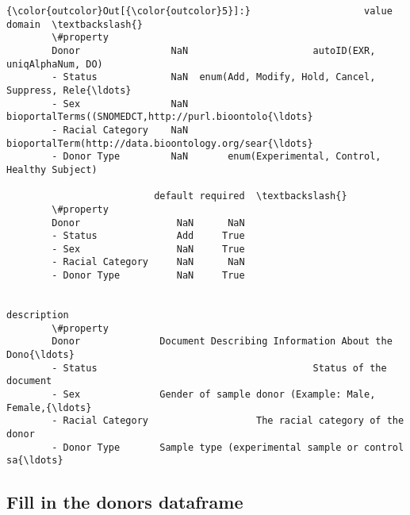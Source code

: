 \documentclass[11pt]{article}
\begin{document}
\begin{Verbatim}[commandchars=\\\{\}]
{\color{outcolor}Out[{\color{outcolor}5}]:}                    value                                             domain  \textbackslash{}
        \#property                                                                     
        Donor                NaN                      autoID(EXR, uniqAlphaNum, DO)   
        - Status             NaN  enum(Add, Modify, Hold, Cancel, Suppress, Rele{\ldots}   
        - Sex                NaN  bioportalTerms((SNOMEDCT,http://purl.bioontolo{\ldots}   
        - Racial Category    NaN  bioportalTerm(http://data.bioontology.org/sear{\ldots}   
        - Donor Type         NaN       enum(Experimental, Control, Healthy Subject)   
        
                          default required  \textbackslash{}
        \#property                            
        Donor                 NaN      NaN   
        - Status              Add     True   
        - Sex                 NaN     True   
        - Racial Category     NaN      NaN   
        - Donor Type          NaN     True   
        
                                                                 description  
        \#property                                                             
        Donor              Document Describing Information About the Dono{\ldots}  
        - Status                                      Status of the document  
        - Sex              Gender of sample donor (Example: Male, Female,{\ldots}  
        - Racial Category                   The racial category of the donor  
        - Donor Type       Sample type (experimental sample or control sa{\ldots}  
\end{Verbatim}
            
    \subsection{Fill in the donors
dataframe}\label{fill-in-the-donors-dataframe}
\end{document}
